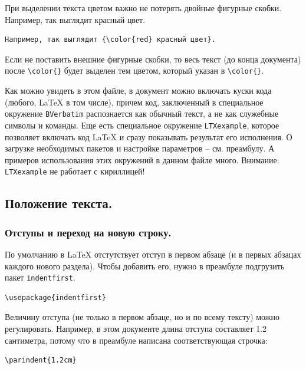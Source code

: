 \documentclass[12pt]{article}
\begin{document}
При выделении текста цветом важно не потерять двойные фигурные скобки. Например, так выглядит {\color{red} красный цвет}. 

\begin{center}
\begin{BVerbatim}
Например, так выглядит {\color{red} красный цвет}.
\end{BVerbatim}
\end{center}

Если не поставить внешние фигурные скобки, то весь текст (до конца документа) после \texttt{\textbackslash color\{\}} будет выделен тем  цветом, который указан в \texttt{\textbackslash color\{\}}.

Как можно увидеть в этом файле, в документ можно включать куски кода (любого, \LaTeX{} в том числе), причем код, заключенный в специальное окружение \texttt{BVerbatim} распознается как обычный текст, а не как служебные символы и команды. Еще есть специальное окружение \texttt{LTXexample}, которое позволяет включать код \LaTeX{} и сразу показывать результат его исполнения. О загрузке необходимых пакетов и настройке параметров -- см. преамбулу. А примеров использования этих окружений в данном файле много. Внимание: \texttt{LTXexample} не работает с кириллицей!

\subsection{Положение текста.}

\subsubsection{Отступы и переход на новую строку.} По умолчанию в \LaTeX{} отстутствует отступ в первом абзаце (и в первых абзацах каждого нового раздела). Чтобы добавить его, нужно в преамбуле подгрузить пакет \texttt{indentfirst}. 

\begin{center}
\begin{BVerbatim}
\usepackage{indentfirst}
\end{BVerbatim}
\end{center}

Величину отступа (не только в первом абзаце, но и по всему тексту) можно регулировать. Например, в этом документе длина отступа составляет 1.2 сантиметра, потому что в преамбуле написана соответствующая строчка:

\begin{center}
\begin{BVerbatim}
\parindent{1.2cm}
\end{BVerbatim}
\end{center}
\end{document}
